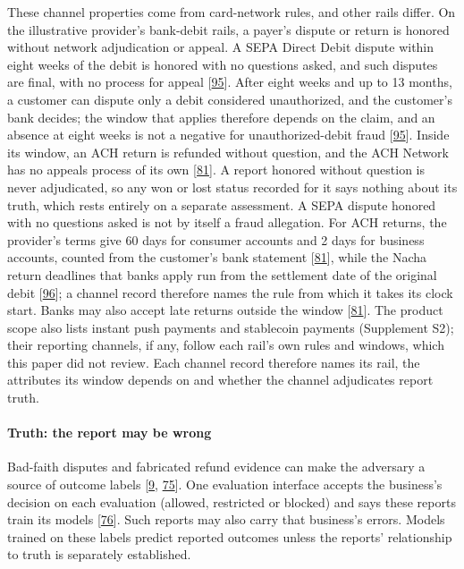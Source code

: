 \documentclass[
  11pt,
]{article}
\begin{document}
These channel properties come from card-network rules, and other rails
differ. On the illustrative provider's bank-debit rails, a payer's
dispute or return is honored without network adjudication or appeal. A
SEPA Direct Debit dispute within eight weeks of the debit is honored
with no questions asked, and such disputes are final, with no process
for appeal {[}\protect\hyperlink{ref-Stripe2026SEPADebit}{95}{]}. After
eight weeks and up to 13 months, a customer can dispute only a debit
considered unauthorized, and the customer's bank decides; the window
that applies therefore depends on the claim, and an absence at eight
weeks is not a negative for unauthorized-debit fraud
{[}\protect\hyperlink{ref-Stripe2026SEPADebit}{95}{]}. Inside its
window, an ACH return is refunded without question, and the ACH Network
has no appeals process of its own
{[}\protect\hyperlink{ref-Stripe2026ACHTerms}{81}{]}. A report honored
without question is never adjudicated, so any won or lost status
recorded for it says nothing about its truth, which rests entirely on a
separate assessment. A SEPA dispute honored with no questions asked is
not by itself a fraud allegation. For ACH returns, the provider's terms
give 60 days for consumer accounts and 2 days for business accounts,
counted from the customer's bank statement
{[}\protect\hyperlink{ref-Stripe2026ACHTerms}{81}{]}, while the Nacha
return deadlines that banks apply run from the settlement date of the
original debit {[}\protect\hyperlink{ref-LeadBank2026ACHReturns}{96}{]};
a channel record therefore names the rule from which it takes its clock
start. Banks may also accept late returns outside the window
{[}\protect\hyperlink{ref-Stripe2026ACHTerms}{81}{]}. The product scope
also lists instant push payments and stablecoin payments (Supplement
S2); their reporting channels, if any, follow each rail's own rules and
windows, which this paper did not review. Each channel record therefore
names its rail, the attributes its window depends on and whether the
channel adjudicates report truth.

\hypertarget{truth-the-report-may-be-wrong}{%
\paragraph{Truth: the report may be
wrong}\label{truth-the-report-may-be-wrong}}

Bad-faith disputes and fabricated refund evidence can make the adversary
a source of outcome labels
{[}\protect\hyperlink{ref-Dhama2026Causal}{9},
\protect\hyperlink{ref-Zhang2026Refund}{75}{]}. One evaluation interface
accepts the business's decision on each evaluation (allowed, restricted
or blocked) and says these reports train its models
{[}\protect\hyperlink{ref-Stripe2026CAE}{76}{]}. Such reports may also
carry that business's errors. Models trained on these labels predict
reported outcomes unless the reports' relationship to truth is
separately established.
\end{document}
